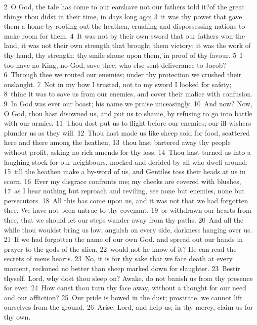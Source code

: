 \documentclass[10pt]{book} %
\begin{document}
\textcolor{benred8}{2}~O God, the tale has come to our ears\textemdash have not our fathers told it?\textemdash of the great things thou didst in their time, in days long ago; \textcolor{benred8}{3}~it was thy power that gave them a home by rooting out the heathen, crushing and dispossessing nations to make room for them. \textcolor{benred8}{4}~It was not by their own sword that our fathers won the land, it was not their own strength that brought them victory; it was the work of thy hand, thy strength; thy smile shone upon them, in proof of thy favour. \textcolor{benred8}{5}~I too have no King, no God, save thee; who else sent deliverance to Jacob? \textcolor{benred8}{6}~Through thee we routed our enemies; under thy protection we crushed their onslaught. \textcolor{benred8}{7}~Not in my bow I trusted, not to my sword I looked for safety; \textcolor{benred8}{8}~thine it was to save us from our enemies, and cover their malice with confusion. \textcolor{benred8}{9}~In God was ever our boast; his name we praise unceasingly.
\textcolor{benred8}{10}~And now? Now, O God, thou hast disowned us, and put us to shame, by refusing to go into battle with our armies. \textcolor{benred8}{11}~Thou dost put us to flight before our enemies; our ill-wishers plunder us as they will. \textcolor{benred8}{12}~Thou hast made us like sheep sold for food, scattered here and there among the heathen; \textcolor{benred8}{13}~thou hast bartered away thy people without profit, asking no rich amends for thy loss. \textcolor{benred8}{14}~Thou hast turned us into a laughing-stock for our neighbours, mocked and derided by all who dwell around; \textcolor{benred8}{15}~till the heathen make a by-word of us, and Gentiles toss their heads at us in scorn. \textcolor{benred8}{16}~Ever my disgrace confronts me; my cheeks are covered with blushes, \textcolor{benred8}{17}~as I hear nothing but reproach and reviling, see none but enemies, none but persecutors.
\textcolor{benred8}{18}~All this has come upon us, and it was not that we had forgotten thee. We have not been untrue to thy covenant, \textcolor{benred8}{19}~or withdrawn our hearts from thee, that we should let our steps wander away from thy paths. \textcolor{benred8}{20}~And all the while thou wouldst bring us low, anguish on every side, darkness hanging over us. \textcolor{benred8}{21}~If we had forgotten the name of our own God, and spread out our hands in prayer to the gods of the alien, \textcolor{benred8}{22}~would not he know of it? He can read the secrets of men\textquotesingle s hearts. \textcolor{benred8}{23}~No, it is for thy sake that we face death at every moment, reckoned no better than sheep marked down for slaughter. \textcolor{benred8}{23}~Bestir thyself, Lord, why dost thou sleep on? Awake, do not banish us from thy presence for ever. \textcolor{benred8}{24}~How canst thou turn thy face away, without a thought for our need and our affliction? \textcolor{benred8}{25}~Our pride is bowed in the dust; prostrate, we cannot lift ourselves from the ground. \textcolor{benred8}{26}~Arise, Lord, and help us; in thy mercy, claim us for thy own.
\end{document}
